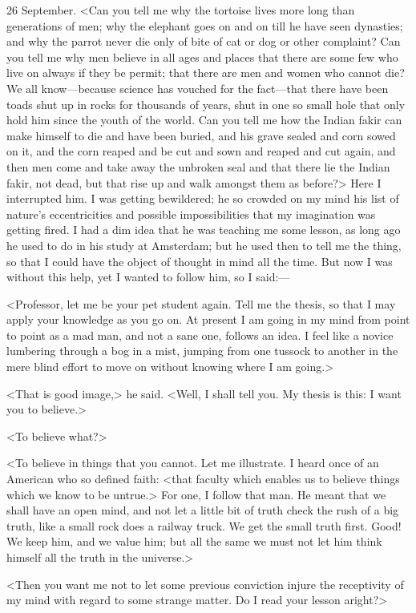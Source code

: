 \begin{diary}{26 September.}
<Can you tell me why the tortoise lives more long than generations of men; why the elephant goes on and on till he have seen dynasties; and why the parrot never die only of bite of cat or dog or other complaint? Can you tell me why men believe in all ages and places that there are some few who live on always if they be permit; that there are men and women who cannot die? We all know—because science has vouched for the fact—that there have been toads shut up in rocks for thousands of years, shut in one so small hole that only hold him since the youth of the world. Can you tell me how the Indian fakir can make himself to die and have been buried, and his grave sealed and corn sowed on it, and the corn reaped and be cut and sown and reaped and cut again, and then men come and take away the unbroken seal and that there lie the Indian fakir, not dead, but that rise up and walk amongst them as before?> Here I interrupted him. I was getting bewildered; he so crowded on my mind his list of nature's eccentricities and possible impossibilities that my imagination was getting fired. I had a dim idea that he was teaching me some lesson, as long ago he used to do in his study at Amsterdam; but he used then to tell me the thing, so that I could have the object of thought in mind all the time. But now I was without this help, yet I wanted to follow him, so I said:—

<Professor, let me be your pet student again. Tell me the thesis, so that I may apply your knowledge as you go on. At present I am going in my mind from point to point as a mad man, and not a sane one, follows an idea. I feel like a novice lumbering through a bog in a mist, jumping from one tussock to another in the mere blind effort to move on without knowing where I am going.>

<That is good image,> he said. <Well, I shall tell you. My thesis is this: I want you to believe.>

<To believe what?>

<To believe in things that you cannot. Let me illustrate. I heard once of an American who so defined faith: <that faculty which enables us to believe things which we know to be untrue.> For one, I follow that man. He meant that we shall have an open mind, and not let a little bit of truth check the rush of a big truth, like a small rock does a railway truck. We get the small truth first. Good! We keep him, and we value him; but all the same we must not let him think himself all the truth in the universe.>

<Then you want me not to let some previous conviction injure the receptivity of my mind with regard to some strange matter. Do I read your lesson aright?>


\end{diary}
